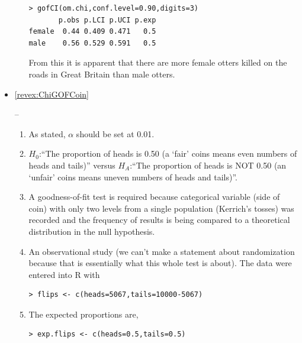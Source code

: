\documentclass[10pt,openany]{book}\usepackage[]{graphicx}\usepackage[]{color}
\makeatletter
\newenvironment{kframe}{%
 \def\at@end@of@kframe{}%
 \ifinner\ifhmode%
  \def\at@end@of@kframe{\end{minipage}}%
  \begin{minipage}{\columnwidth}%
 \fi\fi%
 \def\FrameCommand##1{\hskip\@totalleftmargin \hskip-\fboxsep
 \colorbox{shadecolor}{##1}\hskip-\fboxsep
     \hskip-\linewidth \hskip-\@totalleftmargin \hskip\columnwidth}%
 \MakeFramed {\advance\hsize-\width
   \@totalleftmargin\z@ \linewidth\hsize
   \@setminipage}}%
 {\par\unskip\endMakeFramed%
 \at@end@of@kframe}
\newenvironment{knitrout}{}{} %
\makeatother
\begin{document}
\begin{itemize}
\begin{enumerate}
\begin{knitrout}
\color{fgcolor}\begin{kframe}
\begin{verbatim}
> gofCI(om.chi,conf.level=0.90,digits=3)
       p.obs p.LCI p.UCI p.exp
female  0.44 0.409 0.471   0.5
male    0.56 0.529 0.591   0.5
\end{verbatim}
\end{kframe}
\end{knitrout}
From this it is apparent that there are more female otters killed on the roads in Great Britain than male otters.
  \end{enumerate}
  \item \hypertarget{ans:ChiGOFCoin}{\ref{revex:ChiGOFCoin}} --
    \begin{enumerate}
      \item As stated, $\alpha$ should be set at 0.01.
      \item $H_{0}$:``The proportion of heads is 0.50 (a `fair' coins means even numbers of heads and tails)'' versus $H_{A}$:``The proportion of heads is NOT 0.50 (an `unfair' coins means uneven numbers of heads and tails)''.
      \item A goodness-of-fit test is required because categorical variable (side of coin) with only two levels from a single population (Kerrich's tosses) was recorded and the frequency of results is being compared to a theoretical distribution in the null hypothesis.
      \item An observational study (we can't make a statement about randomization because that is essentially what this whole test is about).  The data were entered into R with
\begin{knitrout}
\color{fgcolor}\begin{kframe}
\begin{verbatim}
> flips <- c(heads=5067,tails=10000-5067)
\end{verbatim}
\end{kframe}
\end{knitrout}
      \item The expected proportions are,
\begin{knitrout}
\color{fgcolor}\begin{kframe}
\begin{verbatim}
> exp.flips <- c(heads=0.5,tails=0.5)
\end{verbatim}

\end{kframe}
\end{knitrout}
\end{enumerate}
\end{itemize}
\end{document}
